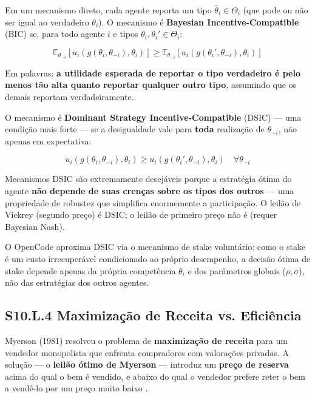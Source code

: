 Em um mecanismo direto, cada agente reporta um tipo $\hat{\theta}_i \in \Theta_i$ (que pode ou não ser igual ao verdadeiro $\theta_i$). O mecanismo é \textbf{Bayesian Incentive-Compatible} (BIC) se, para todo agente $i$ e tipos $\theta_i, \theta_i' \in \Theta_i$:

\begin{equation}\label{eq:bic}
\mathbb{E}_{\theta_{-i}}\left[u_i(g(\theta_i, \theta_{-i}), \theta_i)\right] \geq \mathbb{E}_{\theta_{-i}}\left[u_i(g(\theta_i', \theta_{-i}), \theta_i)\right]
\end{equation}

Em palavras: \textbf{a utilidade esperada de reportar o tipo verdadeiro é pelo menos tão alta quanto reportar qualquer outro tipo}, assumindo que os demais reportam verdadeiramente.

O mecanismo é \textbf{Dominant Strategy Incentive-Compatible} (DSIC) --- uma condição mais forte --- se a desigualdade vale para \textbf{toda} realização de $\theta_{-i}$, não apenas em expectativa:

\begin{equation}\label{eq:dsic}
u_i(g(\theta_i, \theta_{-i}), \theta_i) \geq u_i(g(\theta_i', \theta_{-i}), \theta_i) \quad \forall \theta_{-i}
\end{equation}

Mecanismos DSIC são extremamente desejáveis porque a estratégia ótima do agente \textbf{não depende de suas crenças sobre os tipos dos outros} --- uma propriedade de robustez que simplifica enormemente a participação. O leilão de Vickrey (segundo preço) é DSIC; o leilão de primeiro preço não é (requer Bayesian Nash).

O OpenCode aproxima DSIC via o mecanismo de stake voluntário: como o stake é um custo irrecuperável condicionado ao próprio desempenho, a decisão ótima de stake depende apenas da própria competência $\theta_i$ e dos parâmetros globais ($\rho, \sigma$), não das estratégias dos outros agentes.

\subsection*{S10.L.4 Maximização de Receita vs. Eficiência}

Myerson (1981) resolveu o problema de \textbf{maximização de receita} para um vendedor monopolista que enfrenta compradores com valorações privadas. A solução --- o \textbf{leilão ótimo de Myerson} --- introduz um \textbf{preço de reserva} acima do qual o bem é vendido, e abaixo do qual o vendedor prefere reter o bem a vendê-lo por um preço muito baixo \cite{myerson1981optimal}.

